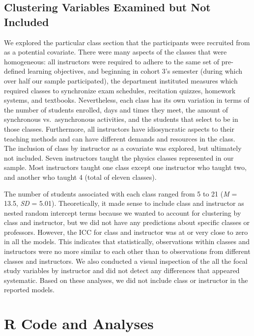 \documentclass[
  letterpaper,
  DIV=11,
  numbers=noendperiod]{scrreprt}
\begin{document}
\chapter{Clustering Variables Examined but Not
Included}\label{clustering-variables-examined-but-not-included}

We explored the particular class section that the participants were
recruited from as a potential covariate. There were many aspects of the
classes that were homogeneous: all instructors were required to adhere
to the same set of pre-defined learning objectives, and beginning in
cohort 3's semester (during which over half our sample participated),
the department instituted measures which required classes to synchronize
exam schedules, recitation quizzes, homework systems, and textbooks.
Nevertheless, each class has its own variation in terms of the number of
students enrolled, days and times they meet, the amount of synchronous
vs.~asynchronous activities, and the students that select to be in those
classes. Furthermore, all instructors have idiosyncratic aspects to
their teaching methods and can have different demands and resources in
the class.~ The inclusion of class by instructor as a covariate was
explored, but ultimately not included. Seven instructors taught the
physics classes represented in our sample. Most instructors taught one
class except one instructor who taught two, and another who taught 4
(total of eleven classes).

The number of students associated with each class ranged from 5 to 21
(\emph{M} = 13.5, \emph{SD} = 5.01). Theoretically, it made sense to
include class and instructor as nested random intercept terms because we
wanted to account for clustering by class and instructor, but we did not
have any predictions about specific classes or professors. However, the
ICC for class and instructor was at or very close to zero in all the
models. This indicates that statistically, observations within classes
and instructors were no more similar to each other than to observations
from different classes and instructors. We also conducted a visual
inspection of the all the focal study variables by instructor and did
not detect any differences that appeared systematic. Based on these
analyses, we did not include class or instructor in the reported models.

\part{R Code and Analyses}
\end{document}
